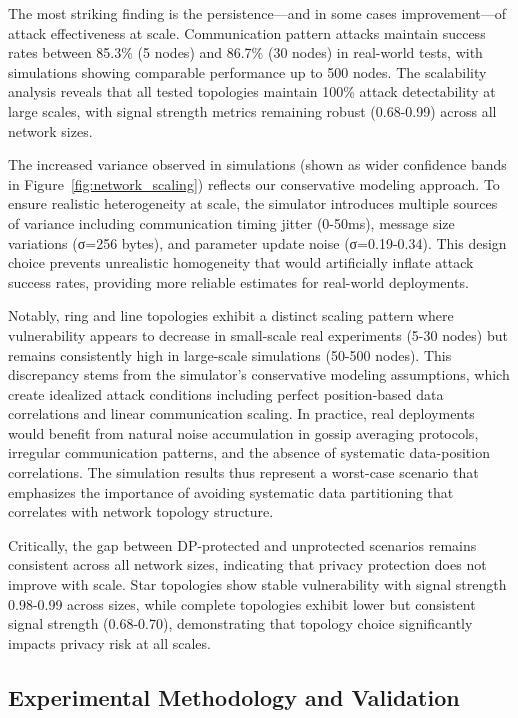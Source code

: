 The most striking finding is the persistence—and in some cases improvement—of attack effectiveness at scale. Communication pattern attacks maintain success rates between 85.3\% (5 nodes) and 86.7\% (30 nodes) in real-world tests, with simulations showing comparable performance up to 500 nodes. The scalability analysis reveals that all tested topologies maintain 100\% attack detectability at large scales, with signal strength metrics remaining robust (0.68-0.99) across all network sizes.

The increased variance observed in simulations (shown as wider confidence bands in Figure~\ref{fig:network_scaling}) reflects our conservative modeling approach. To ensure realistic heterogeneity at scale, the simulator introduces multiple sources of variance including communication timing jitter (0-50ms), message size variations (σ=256 bytes), and parameter update noise (σ=0.19-0.34). This design choice prevents unrealistic homogeneity that would artificially inflate attack success rates, providing more reliable estimates for real-world deployments.

Notably, ring and line topologies exhibit a distinct scaling pattern where vulnerability appears to decrease in small-scale real experiments (5-30 nodes) but remains consistently high in large-scale simulations (50-500 nodes). This discrepancy stems from the simulator's conservative modeling assumptions, which create idealized attack conditions including perfect position-based data correlations and linear communication scaling. In practice, real deployments would benefit from natural noise accumulation in gossip averaging protocols, irregular communication patterns, and the absence of systematic data-position correlations. The simulation results thus represent a worst-case scenario that emphasizes the importance of avoiding systematic data partitioning that correlates with network topology structure.

Critically, the gap between DP-protected and unprotected scenarios remains consistent across all network sizes, indicating that privacy protection does not improve with scale. Star topologies show stable vulnerability with signal strength 0.98-0.99 across sizes, while complete topologies exhibit lower but consistent signal strength (0.68-0.70), demonstrating that topology choice significantly impacts privacy risk at all scales.

\subsection{Experimental Methodology and Validation}

